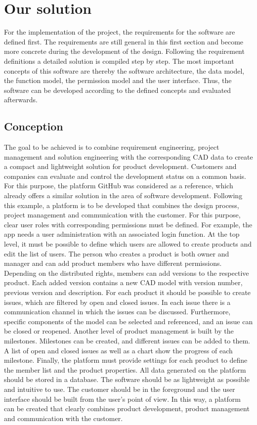 \section{Our solution}
    \label{sec:contribution} 
    For the implementation of the project, the requirements for the software are defined first. The requirements are still general in this first section and become more concrete during the development of the design. Following the requirement definitions a detailed solution is compiled step by step. The most important concepts of this software are thereby the software architecture, the data model, the function model, the permission model and the user interface. Thus, the software can be developed according to the defined concepts and evaluated afterwards.

    \subsection*{Conception}
    The goal to be achieved is to combine requirement engineering, project management and solution engineering with the corresponding CAD data to create a compact and lightweight solution for product development. Customers and companies can evaluate and control the development status on a common basis. For this purpose, the platform GitHub was considered as a reference, which already offers a similar solution in the area of software development. Following this example, a platform is to be developed that combines the design process, project management and communication with the customer. For this purpose, clear user roles with corresponding permissions must be defined. For example, the app needs a user administration with an associated login function. At the top level, it must be possible to define which users are allowed to create products and edit the list of users. The person who creates a product is both owner and manager and can add product members who have different permissions. Depending on the distributed rights, members can add versions to the respective product. Each added version contains a new CAD model with version number, previous version and description. For each product it should be possible to create issues, which are filtered by open and closed issues. In each issue there is a communication channel in which the issues can be discussed. Furthermore, specific components of the model can be selected and referenced, and an issue can be closed or reopened. Another level of product management is built by the milestones. Milestones can be created, and different issues can be added to them. A list of open and closed issues as well as a chart show the progress of each milestone. Finally, the platform must provide settings for each product to define the member list and the product properties. All data generated on the platform should be stored in a database. The software should be as lightweight as possible and intuitive to use. The customer should be in the foreground and the user interface should be built from the user's point of view. In this way, a platform can be created that clearly combines product development, product management and communication with the customer.

